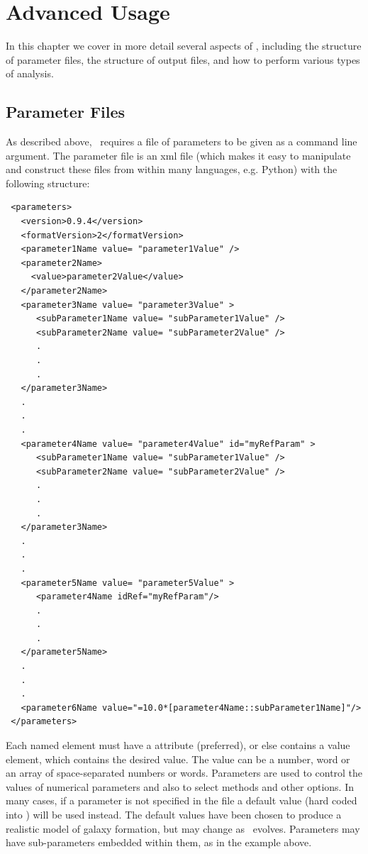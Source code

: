 \chapter{Advanced Usage}

In this chapter we cover in more detail several aspects of \glc, including the structure of parameter files, the structure of output files, and how to perform various types of analysis.

\section{Parameter Files}\label{sec:ParameterFiles}

As described above, \glc\ requires a file of parameters to be given as a command line argument. The parameter file is an \gls{xml} file (which makes it easy to manipulate and construct these files from within many languages, e.g. Python) with the following structure:
\begin{verbatim}
 <parameters>
   <version>0.9.4</version>
   <formatVersion>2</formatVersion>
   <parameter1Name value= "parameter1Value" />
   <parameter2Name>
     <value>parameter2Value</value>
   </parameter2Name>
   <parameter3Name value= "parameter3Value" >
      <subParameter1Name value= "subParameter1Value" />
      <subParameter2Name value= "subParameter2Value" />
      .
      .
      .
   </parameter3Name>
   .
   .
   .
   <parameter4Name value= "parameter4Value" id="myRefParam" >
      <subParameter1Name value= "subParameter1Value" />
      <subParameter2Name value= "subParameter2Value" />
      .
      .
      .
   </parameter3Name>
   .
   .
   .
   <parameter5Name value= "parameter5Value" >
      <parameter4Name idRef="myRefParam"/>
      .
      .
      .
   </parameter5Name>
   .
   .
   .
   <parameter6Name value="=10.0*[parameter4Name::subParameter1Name]"/>
 </parameters>
\end{verbatim}
Each named element must have a  attribute (preferred), or else contains a value element, which contains the desired value. The value can be a number, word or an array of space-separated numbers or words. Parameters are used to control the values of numerical parameters and also to select methods and other options. In many cases, if a parameter is not specified in the file a default value (hard coded into \glc) will be used instead. The default values have been chosen to produce a realistic model of galaxy formation, but may change as \glc\ evolves. Parameters may have sub-parameters embedded within them, as in the example above.


